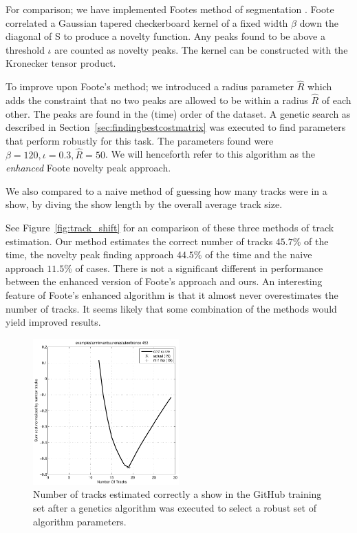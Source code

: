 \documentclass[twocolumn]{article}
\begin{document}
For comparison; we have implemented Footes method of segmentation \citep{foote2003media}. Foote correlated a Gaussian tapered checkerboard kernel of a fixed width $\beta$ down the diagonal of S to produce a novelty function. Any peaks found to be above a threshold $\iota$ are counted as novelty peaks. The kernel can be constructed with the Kronecker tensor product.

To improve upon Foote's method; we introduced a radius parameter $\hat R$ which adds the constraint that no two peaks are allowed to be within a radius $\hat R$ of each other. The peaks are found in the (time) order of the dataset. A genetic search as described in Section~\ref{sec:findingbestcostmatrix} was executed to find parameters that perform robustly for this task. The parameters found were $\beta=120, \iota=0.3, \hat R=50$. We will henceforth refer to this algorithm as the \textit{enhanced} Foote novelty peak approach.

We also compared to a naive method of guessing how many tracks were in a show, by diving the show length by the overall average track size.

See Figure~\ref{fig:track_shift} for an comparison of these three methods of track estimation. Our method estimates the correct number of tracks $45.7$\% of the time, the novelty peak finding approach $44.5$\% of the time and the naive approach $11.5$\% of cases. There is not a significant different in performance between the enhanced version of Foote's approach and ours. An interesting feature of Foote's enhanced algorithm is that it almost never overestimates the number of tracks. It seems likely that some combination of the methods would yield improved results. 


\begin{figure}
	\centering
	\includegraphics[width=0.5\textwidth]{images/trackestimate}
	\caption{Number of tracks estimated correctly a show in the GitHub training set after a genetics algorithm was executed to select a robust set of algorithm parameters.}
	\label{fig:github_trackestimation}
\end{figure}
\end{document}
